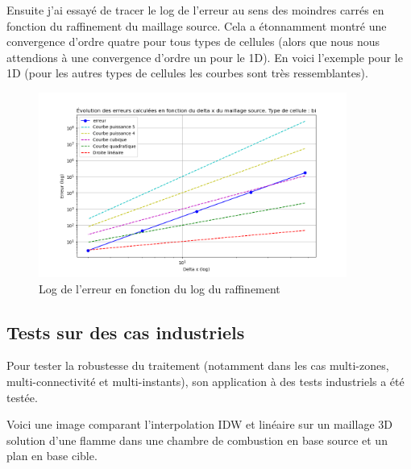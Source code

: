 Ensuite j'ai essayé de tracer le log de l'erreur au sens des moindres carrés en fonction du raffinement du maillage source. Cela a étonnamment montré une convergence d'ordre quatre pour tous types de cellules (alors que nous nous attendions à une convergence d'ordre un pour le 1D). En voici l'exemple pour le 1D (pour les autres types de cellules les courbes sont très ressemblantes).
\begin{figure}[H]
    \centering
    \includegraphics[width=0.90\textwidth]{images/err_puissance2_bi.png}
    \caption{Log de l'erreur en fonction du log du raffinement}
    \label{fig:bi}
\end{figure}


\subsection{Tests sur des cas industriels}

Pour tester la robustesse du traitement (notamment dans les cas multi-zones, multi-connectivité et multi-instants), son application à des tests industriels a été testée.

Voici une image comparant l'interpolation IDW et linéaire sur un maillage 3D solution d'une flamme dans une chambre de combustion en base source et un plan en base cible.

